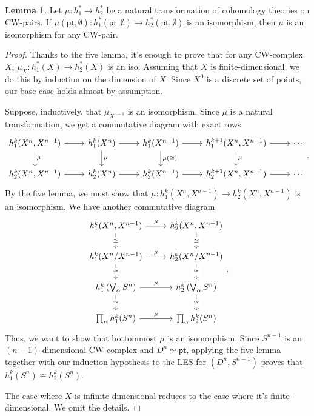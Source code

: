 \documentclass[10pt,letterpaper,cm]{nupset}
\theoremstyle{definition}
\theoremstyle{theorem}
\newtheorem{lemma}[definition]{Lemma}
\theoremstyle{remark}
\newcommand{\1}{\mathbb{1}}
\newcommand{\0}{\vec 0}
\newcommand{\pt}{\mathsf{pt}}
\begin{document}
\begin{lemma}
Let $\mu : h^{\ast}_1 \to h^{\ast}_2$ be a natural transformation of cohomology theories on CW-pairs. If $\mu(\pt, \emptyset) : h_1^{\ast}(\pt, \emptyset) \to h_2^{\ast}(\pt, \emptyset)$ is an isomorphism, then $\mu$ is an isomorphism for any CW-pair.
\end{lemma}
\begin{proof}
Thanks to the five lemma, it's enough to prove that for any CW-complex $X$, $\mu_X : h_1^{\ast}(X) \to h_2^{\ast}(X)$ is an iso. Assuming that $X$ is finite-dimensional, we do this by induction on the dimension of $X$. Since $X^0$ is a discrete set of points, our base case holds almost by assumption.  

\medskip

 Suppose, inductively, that $\mu_{X^{n-1}}$ is an isomorphism. Since $\mu$ is a natural transformation, we get a commutative diagram with exact rows
\[
\begin{tikzcd}
{h_1^k(X^n, X^{n-1})} \arrow[r] \arrow[d, "\mu"] & h_1^k(X^n) \arrow[r] \arrow[d, "\mu"] & h_1^k(X^{n-1}) \arrow[r] \arrow[d, "\mu(\cong)"] & {h_1^{k+1}(X^n, X^{n-1})} \arrow[r] \arrow[d, "\mu"] & \cdots \\
{h_2^k(X^n, X^{n-1})} \arrow[r]                  & h_2^k(X^n) \arrow[r]                  & h_2^k(X^{n-1}) \arrow[r]                         & {h_2^{k+1}(X^n, X^{n-1})} \arrow[r]                  & \cdots
\end{tikzcd}.
\] By the five lemma, we must show that $\mu : h_1^k(X^n, X^{n-1}) \to h_2^k(X^n, X^{n-1})$ is an isomorphism. We have another commutative diagram
\[
\begin{tikzcd}
{h_1^k(X^n, X^{n-1})} \arrow[d, "\cong" description] \arrow[r, "\mu"]       & {h_2^k(X^n, X^{n-1})} \arrow[d, "\cong" description]       \\
h_1^k(X^n/X^{n-1}) \arrow[d, "\cong" description] \arrow[r, "\mu"]          & h_2^k(X^n/X^{n-1}) \arrow[d, "\cong" description]          \\
h_1^k\left(\bigvee_{\alpha} S^n\right) \arrow[d, "\cong" description] \arrow[r, "\mu"] & h_2^k\left(\bigvee_{\alpha} S^n\right) \arrow[d, "\cong" description] \\
\prod_{\alpha}h_1^k(S^n) \arrow[r, "\mu"]                                   & \prod_{\alpha}h_2^k(S^n)                                  
\end{tikzcd}
.\] Thus, we want to show that bottommost $\mu$ is an isomorphism. Since $S^{n-1}$ is an $\left(n-1\right)$-dimensional CW-complex and $D^n \simeq \pt$, applying the five lemma together with our induction hypothesis to the LES for $\left(D^n, S^{n-1}\right)$ proves that $h_1^k(S^n) \cong h_2^k(S^n)$.

\medskip

 The case where $X$ is infinite-dimensional reduces to the case where it's finite-dimensional. We omit the details. 
\end{proof}
\end{document}
